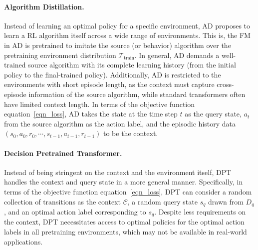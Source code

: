 \documentclass[10pt]{article}
\def\eqref#1{equation~\ref{#1}}
\def\ccalC{{\ensuremath{\mathcal C}}}
\def\ccalT{{\ensuremath{\mathcal T}}}
\begin{document}
\paragraph{Algorithm Distillation.} Instead of learning an optimal policy for a specific environment, AD proposes to learn a RL algorithm itself across a wide range of environments. This is, the FM in AD is pretrained to imitate the source (or behavior) algorithm over the pretraining environment distribution $\ccalT_{\text{train}}$. In general, AD demands a well-trained source algorithm with its complete learning history (from the initial policy to the final-trained policy). Additionally, AD is restricted to the environments with short episode length, as the context must capture cross-episode information of the source algorithm, while standard transformers often have limited context length.
In terms of the objective function \eqref{eqn_loss}, AD takes the state at the time step $t$ as the query state, $a_t$ from the source algorithm as the action label, and the episodic history data $(s_0, a_0, r_0, \cdots, s_{t-1}, a_{t-1}, r_{t-1})$ to be the context.
\paragraph{Decision Pretrained Transformer.}
Instead of being stringent on the context and the environment itself, DPT handles the context and query state in a more general manner.
Specifically, in terms of the objective function \eqref{eqn_loss}, DPT can consider a random collection of transitions as the context $\ccalC$, a random query state $s_q$ drawn from $D_q$, and an optimal action label corresponding to $s_q$.
Despite less requirements on the context, DPT necessitates access to optimal policies for the optimal action labels in all pretraining environments, which may not be available in real-world applications.
\end{document}
